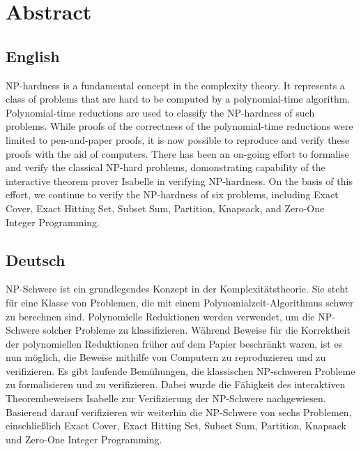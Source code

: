\newcommand{\abstractname}{Abstract}


\chapter{\abstractname}

\section*{English}
NP-hardness is a fundamental concept in the complexity theory. It represents a class of problems that 
are hard to be computed by a polynomial-time algorithm. Polynomial-time reductions are used 
to classify the NP-hardness of such problems. While proofs of the correctness of the polynomial-time reductions 
were limited to pen-and-paper proofs, 
it is now possible to reproduce and verify these proofs with the aid of computers. 
There has been an on-going effort to formalise and verify the classical NP-hard problems, 
domonstrating capability of the interactive theorem prover Isabelle in verifying NP-hardness.
On the basis of this effort, we continue to verify the NP-hardness of six problems, 
including Exact Cover, Exact Hitting Set, Subset Sum, Partition, Knapsack, and Zero-One Integer Programming.

\section*{Deutsch}
NP-Schwere ist ein grundlegendes Konzept in der Komplexitätstheorie. 
Sie steht für eine Klasse von Problemen, die mit einem Polynomialzeit-Algorithmus schwer zu berechnen sind. 
Polynomielle Reduktionen werden verwendet, um die NP-Schwere solcher Probleme zu klassifizieren. 
Während Beweise für die Korrektheit der polynomiellen Reduktionen früher auf dem Papier beschränkt waren, 
ist es nun möglich, die Beweise mithilfe von Computern zu reproduzieren und zu verifizieren. 
Es gibt laufende Bemühungen, die klassischen NP-schweren Probleme zu formalisieren und zu verifizieren. 
Dabei wurde die Fähigkeit des interaktiven Theorembeweisers Isabelle zur Verifizierung der NP-Schwere nachgewiesen. 
Basierend darauf verifizieren wir weiterhin die NP-Schwere von sechs Problemen, 
einschließlich Exact Cover, Exact Hitting Set, Subset Sum, Partition, Knapsack und Zero-One Integer Programming.